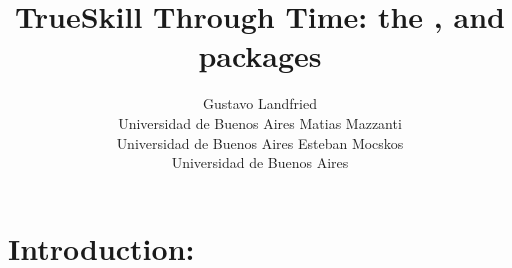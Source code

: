 \documentclass[article]{jss}
\author{Gustavo Landfried \\Universidad de Buenos Aires
   \And Matias Mazzanti \\Universidad de Buenos Aires
   \And Esteban Mocskos \\Universidad de Buenos Aires}
\title{TrueSkill Through Time: the \proglang{Julia}, \proglang{Python} and \proglang{R} packages}
\newif\ifen
\newif\ifes
\newcommand{\en}[1]{\ifen#1\fi}
\newcommand{\es}[1]{\ifes#1\fi}
\begin{document}

\section[Introduction]{Introduction: } \label{sec:intro}

\en{Humans develop complex skills because of an special integration of biological, cognitive and social processes~\citep{Koster2020}.}
\es{Los humanos desarrollan habilidades complejas gracias a una integraci\'on especial de los procesos biol\'ogicos, cognitivos y sociales~\citep{Koster2020}.}
%
\en{An exceptional cognitive ability to imitate, combined with long periods of juvenile dependency and postreproductive life span, allows humans to learn things from others and transmit innovations through generations~\citep{Richerson2020}.}
\es{Una extraordinaria capacidad para imitar, combinada con los largos per\'iodos de aprendizaje juvenil y vida posreproductiva, permite a los humanos aprender de los dem\'as y transmitir las innovaci\'on a trav\'es de la generaciones~\citep{Richerson2020}.}
%
\en{As a population-based process, human adaptation is also affected by demographic characteristics, such as the size and structure of populations~\citep{Derex2020}.}
\es{Al ser un proceso poblacional, la adaptaci\'on humana tambi\'en se ve afectada por caracter\'isticas demogr\'aficas, como el tama\~no y estructura de las poblaciones~\citep{Derex2020}.} 

%
\end{document}

